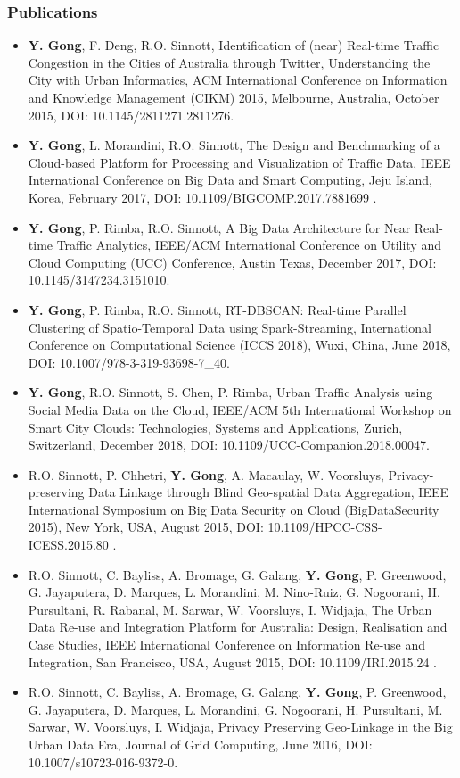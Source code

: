 \begin{frame}[plain]
    \frametitle{Publications}
    \begin{itemize} \tiny
    \item {\bf Y. Gong}, F. Deng, R.O. Sinnott, Identification of (near) Real-time Traffic Congestion in the Cities of Australia through Twitter, Understanding the City with Urban Informatics, ACM International Conference on Information and Knowledge Management (CIKM) 2015, Melbourne, Australia, October 2015, DOI: 10.1145/2811271.2811276.
    \item {\bf Y. Gong}, L. Morandini, R.O. Sinnott, The Design and Benchmarking of a Cloud-based Platform for Processing and Visualization of Traffic Data, IEEE International Conference on Big Data and Smart Computing, Jeju Island, Korea, February 2017,  DOI: 10.1109/BIGCOMP.2017.7881699 .
    \item {\bf Y. Gong}, P. Rimba, R.O. Sinnott, A Big Data Architecture for Near Real-time Traffic Analytics, IEEE/ACM International Conference on Utility and Cloud Computing (UCC) Conference, Austin Texas, December 2017, DOI: 10.1145/3147234.3151010.
    \item {\bf Y. Gong}, P. Rimba, R.O. Sinnott, RT-DBSCAN: Real-time Parallel Clustering of Spatio-Temporal Data using Spark-Streaming, International Conference on Computational Science (ICCS 2018), Wuxi, China, June 2018, DOI: 10.1007/978-3-319-93698-7\_40.
    \item {\bf Y. Gong}, R.O. Sinnott, S. Chen, P. Rimba, Urban Traffic Analysis using Social Media Data on the Cloud, IEEE/ACM 5th International Workshop on Smart City Clouds: Technologies, Systems and Applications, Zurich, Switzerland, December 2018, DOI: 10.1109/UCC-Companion.2018.00047.
    
    \item R.O. Sinnott, P. Chhetri, {\bf Y. Gong}, A. Macaulay, W. Voorsluys, Privacy-preserving Data Linkage through Blind Geo-spatial Data Aggregation, IEEE International Symposium on Big Data Security on Cloud (BigDataSecurity 2015), New York, USA, August 2015, DOI: 10.1109/HPCC-CSS-ICESS.2015.80 .
    \item R.O. Sinnott, C. Bayliss, A. Bromage, G. Galang, {\bf Y. Gong}, P. Greenwood, G. Jayaputera, D. Marques, L. Morandini, M. Nino-Ruiz, G. Nogoorani, H. Pursultani, R. Rabanal, M. Sarwar, W. Voorsluys, I. Widjaja, The Urban Data Re-use and Integration Platform for Australia: Design, Realisation and Case Studies, IEEE International Conference on Information Re-use and Integration, San Francisco, USA, August 2015,  DOI: 10.1109/IRI.2015.24 .
    \item R.O. Sinnott, C. Bayliss, A. Bromage, G. Galang, {\bf Y. Gong}, P. Greenwood, G. Jayaputera, D. Marques, L. Morandini, G. Nogoorani, H. Pursultani, M. Sarwar, W. Voorsluys, I. Widjaja, Privacy Preserving Geo-Linkage in the Big Urban Data Era, Journal of Grid Computing, June 2016, DOI: 10.1007/s10723-016-9372-0.
    \end{itemize}
\end{frame}

